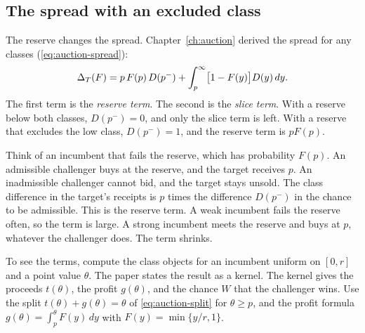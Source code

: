 \subsection{The spread with an excluded class}\label{sec:welfare-reservespread}

The reserve changes the spread. Chapter~\ref{ch:auction} derived the spread for any classes (\eqref{eq:auction-spread}):
\[
\Delta_T(F)=p\,F(p)\,D(p^-)+\int_p^\infty\bigl[1-F(y)\bigr]D(y)\,dy .
\]
The first term is the \emph{reserve term}. The second is the \emph{slice term}. With a reserve below both classes,
\(D(p^-)=0\), and only the slice term is left. With a reserve that excludes the low class, \(D(p^-)=1\), and the reserve
term is \(pF(p)\).

\begin{intuition}
Think of an incumbent that fails the reserve, which has probability \(F(p)\). An admissible challenger buys at the
reserve, and the target receives \(p\). An inadmissible challenger cannot bid, and the target stays unsold. The class
difference in the target's receipts is \(p\) times the difference \(D(p^-)\) in the chance to be admissible. This is the
reserve term. A weak incumbent fails the reserve often, so the term is large. A strong incumbent meets the reserve and
buys at \(p\), whatever the challenger does. The term shrinks.
\end{intuition}

To see the terms, compute the class objects for an incumbent uniform on \([0,r]\) and a point value \(\theta\). The paper
states the result as a kernel. The kernel gives the proceeds \(t(\theta)\), the profit \(g(\theta)\), and the chance \(W\)
that the challenger wins. Use the split \(t(\theta)+g(\theta)=\theta\) of \eqref{eq:auction-split} for \(\theta\ge p\),
and the profit formula \(g(\theta)=\int_p^\theta F(y)\,dy\) with \(F(y)=\min\{y/r,1\}\).

